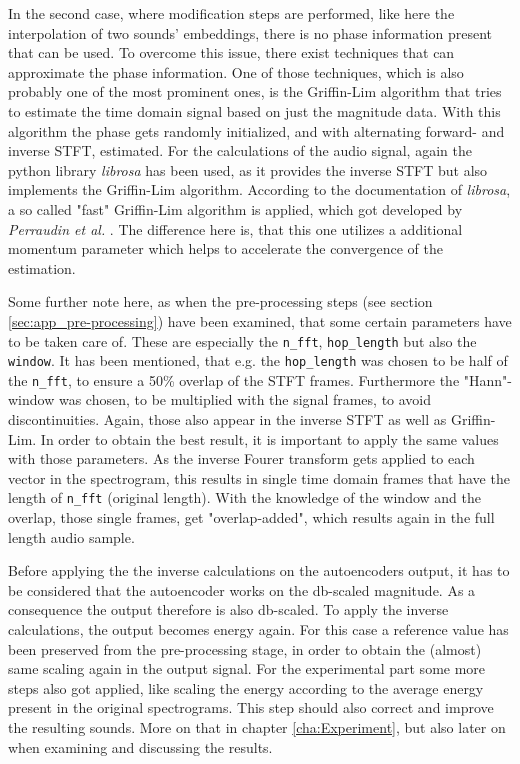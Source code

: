 In the second case, where modification steps are performed, like here the interpolation of two sounds' embeddings, there is no phase information present that can be used. To overcome this issue, there exist techniques that can approximate the phase information. One of those techniques, which is also probably one of the most prominent ones, is the Griffin-Lim \cite{Griffin1984} algorithm that tries to estimate the time domain signal based on just the magnitude data. With this algorithm the phase gets randomly initialized, and with alternating forward- and inverse STFT, estimated. For the calculations of the audio signal, again the python library \textit{librosa} \cite{brian_mcfee_2022_6097378} has been used, as it provides the inverse STFT but also implements the Griffin-Lim algorithm. According to the documentation of \textit{librosa}, a so called "fast" Griffin-Lim algorithm is applied, which got developed by \textit{Perraudin et al.} \cite{Perraudin2013}. The difference here is, that this one utilizes a additional momentum parameter which helps to accelerate the convergence of the estimation. 

Some further note here, as when the pre-processing steps (see section \ref{sec:app_pre-processing}) have been examined, that some certain parameters have to be taken care of. These are especially the \texttt{n\_fft}, \texttt{hop\_length} but also the \texttt{window}. It has been mentioned, that e.g. the \texttt{hop\_length} was chosen to be half of the \texttt{n\_fft}, to ensure a 50\% overlap of the STFT frames. Furthermore the "Hann"-window was chosen, to be multiplied with the signal frames, to avoid discontinuities. Again, those also appear in the inverse STFT as well as Griffin-Lim. In order to obtain the best result, it is important to apply the same values with those parameters. As the inverse Fourer transform gets applied to each vector in the spectrogram, this results in single time domain frames that have the length of \texttt{n\_fft} (original length). With the knowledge of the window and the overlap, those single frames, get "overlap-added", which results again in the full length audio sample. 

Before applying the the inverse calculations on the autoencoders output, it has to be considered that the autoencoder works on the db-scaled magnitude. As a consequence the output therefore is also db-scaled. To apply the inverse calculations, the output becomes energy again. For this case a reference value has been preserved from the pre-processing stage, in order to obtain the (almost) same scaling again in the output signal. For the experimental part some more steps also got applied, like scaling the energy according to the average energy present in the original spectrograms. This step should also correct and improve the resulting sounds. More on that in chapter \ref{cha:Experiment}, but also later on when examining and discussing the results.



